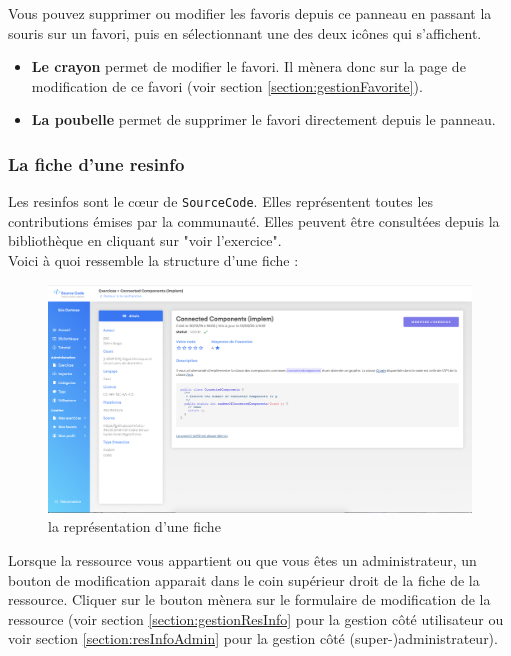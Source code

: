Vous pouvez supprimer ou modifier les favoris depuis ce panneau en passant la souris sur un favori, puis en sélectionnant une des deux icônes qui s'affichent.

\begin{itemize}
    \item \textbf{Le crayon} permet de modifier le favori. Il mènera donc sur la page de modification de ce favori (voir section \ref{section:gestionFavorite}).
    \item \textbf{La poubelle} permet de supprimer le favori directement depuis le panneau.
\end{itemize}


\subsubsection{La \gls{fiche} d’une \gls{resinfo}}
\label{section:ficheResInfo}

Les \glspl{resinfo} sont le cœur de \texttt{SourceCode}. Elles représentent toutes les contributions émises par la communauté. Elles peuvent être consultées depuis la bibliothèque en cliquant sur "voir l'exercice".\\

Voici à quoi ressemble la structure d'une \gls{fiche} :

\begin{figure}[H]
    \includegraphics[width=\textwidth,height=\textheight,keepaspectratio]{images/client/fiche.png}
    \centering
    \caption[SourceCode : la représentation d'une \gls{fiche}]{la représentation d'une \gls{fiche}}
\end{figure}

Lorsque la ressource vous appartient ou que vous êtes un administrateur, un bouton de modification apparait dans le coin supérieur droit de la \gls{fiche} de la ressource. Cliquer sur le bouton mènera sur le formulaire de modification de la ressource (voir section \ref{section:gestionResInfo} pour la gestion côté utilisateur ou voir section \ref{section:resInfoAdmin} pour la gestion côté (super-)administrateur).\\

